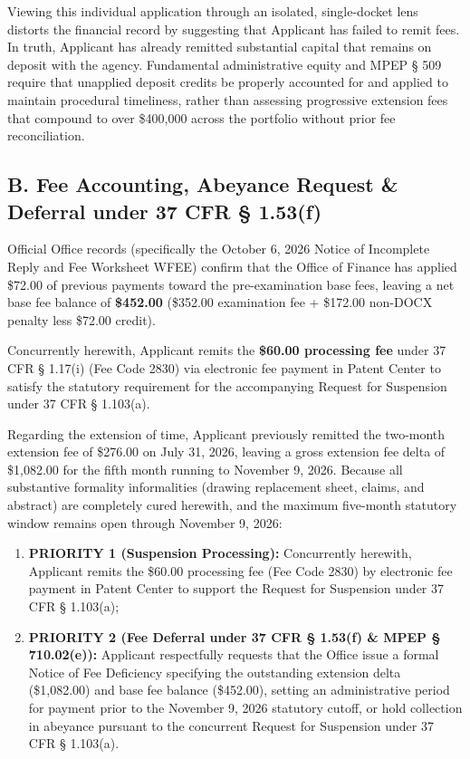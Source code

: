 \documentclass[11pt,letterpaper]{article}
\begin{document}
Viewing this individual application through an isolated, single-docket lens distorts the financial record by suggesting that Applicant has failed to remit fees. In truth, Applicant has already remitted substantial capital that remains on deposit with the agency. Fundamental administrative equity and MPEP \S{} 509 require that unapplied deposit credits be properly accounted for and applied to maintain procedural timeliness, rather than assessing progressive extension fees that compound to over \$400,000 across the portfolio without prior fee reconciliation.

\subsection*{B. Fee Accounting, Abeyance Request \& Deferral under 37 CFR \S{} 1.53(f)}
Official Office records (specifically the October 6, 2026 Notice of Incomplete Reply and Fee Worksheet WFEE) confirm that the Office of Finance has applied \$72.00 of previous payments toward the pre-examination base fees, leaving a net base fee balance of \textbf{\$452.00} (\$352.00 examination fee + \$172.00 non-DOCX penalty less \$72.00 credit).

Concurrently herewith, Applicant remits the \textbf{\$60.00 processing fee} under 37 CFR \S{} 1.17(i) (Fee Code 2830) via electronic fee payment in Patent Center to satisfy the statutory requirement for the accompanying Request for Suspension under 37 CFR \S{} 1.103(a).

Regarding the extension of time, Applicant previously remitted the two-month extension fee of \$276.00 on July 31, 2026, leaving a gross extension fee delta of \$1,082.00 for the fifth month running to November 9, 2026. Because all substantive formality informalities (drawing replacement sheet, claims, and abstract) are completely cured herewith, and the maximum five-month statutory window remains open through November 9, 2026:
\begin{enumerate}[leftmargin=*]
    \item \textbf{PRIORITY 1 (Suspension Processing):} Concurrently herewith, Applicant remits the \$60.00 processing fee (Fee Code 2830) by electronic fee payment in Patent Center to support the Request for Suspension under 37 CFR \S{} 1.103(a);
    \item \textbf{PRIORITY 2 (Fee Deferral under 37 CFR \S{} 1.53(f) \& MPEP \S{} 710.02(e)):} Applicant respectfully requests that the Office issue a formal Notice of Fee Deficiency specifying the outstanding extension delta (\$1,082.00) and base fee balance (\$452.00), setting an administrative period for payment prior to the November 9, 2026 statutory cutoff, or hold collection in abeyance pursuant to the concurrent Request for Suspension under 37 CFR \S{} 1.103(a).
\end{enumerate}
\end{document}
